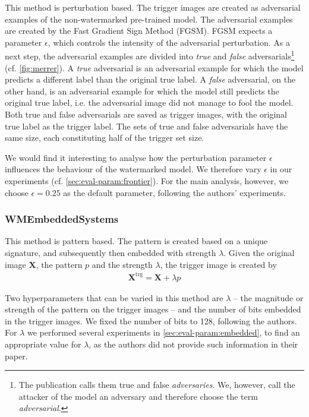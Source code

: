 This method is perturbation based. The trigger images are created as adversarial examples of the non-watermarked pre-trained model. The adversarial examples are created by the Fast Gradient Sign Method (FGSM). FGSM expects a parameter $\epsilon$, which controls the intensity of the adversarial perturbation. As a next step, the adversarial examples are divided into \textit{true} and \textit{false} adversarials\footnote{The publication calls them true and false \textit{adversaries}. We, however, call the attacker of the model an adversary and therefore choose the term \textit{adversarial}.} (cf. \cref{fig:merrer}). A \textit{true} adversarial is an adversarial example for which the model predicts a different label than the original true label. A \textit{false} adversarial, on the other hand, is an adversarial example for which the model still predicts the original true label, i.e. the adversarial image did not manage to fool the model. Both true and false adversarials are saved as trigger images, with the original true label as the trigger label. The sets of true and false adversarials have the same size, each constituting half of the trigger set size.

We would find it interesting to analyse how the perturbation parameter $\epsilon$ influences the behaviour of the watermarked model. We therefore vary $\epsilon$ in our experiments (cf. \cref{sec:eval-param:frontier}). For the main analysis, however, we choose $\epsilon=0.25$ as the default parameter, following the authors' experiments.

\subsubsection{WMEmbeddedSystems}
\label{sec:embedded}

This method is pattern based. The pattern is created based on a unique signature, and subsequently then embedded with strength $\lambda$. Given the original image $\mathbf{X}$, the pattern $p$ and the strength $\lambda$, the trigger image is created by
\begin{align}
    \mathbf{X}^{\mathrm{trg}} = \mathbf{X} + \lambda p
\end{align}

Two hyperparameters that can be varied in this method are $\lambda$ -- the magnitude or strength of the pattern on the trigger images -- and the number of bits embedded in the trigger images. We fixed the number of bits to 128, following the authors. For $\lambda$ we performed several experiments in \cref{sec:eval-param:embedded}, to find an appropriate value for $\lambda$, as the authors did not provide such information in their paper.

